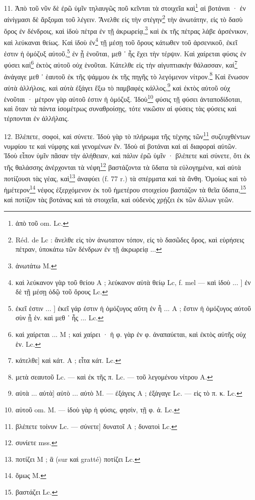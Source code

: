 \documentclass[a4paper, 11pt, oneside, polutonikogreek, french]{article}
\begin{document}
11. Ἀπὸ τοῦ νῦν δὲ ἐρῶ ὑμῖν τηλαυγῶς ποῦ κεῖνται τὰ στοιχεῖα καὶ\footnote{ἀπὸ τοῦ om. Lc.} αἱ βοτάναι · ἐν αἰνίγμασι δὲ ἄρξομαι τοῦ λέγειν. Ἄνελθε εἰς τὴν στέγην\footnote{Réd. de Lc : ἄνελθε εἰς τὸν ἀνωτατον τόπον, εἰς τὸ δασῶδες ὄρος, καὶ εὑρήσεις πέτραν, ὑποκάτω τῶν δένδρων ἐν τῇ ἀκρωρείᾳ ...} τὴν ἀνωτάτην, εἰς τὸ δασὺ ὄρος ἐν δένδροις, καὶ ἰδοὺ πέτρα ἐν τῇ ἀκρωρείᾳ,\footnote{ἀνωτάτω M.} καὶ ἐκ τῆς πέτρας λάβε ἀρσένικον, καὶ λεύκαναι θείως. Καὶ ἰδοὺ ἐν\footnote{καὶ λεύκανον γὰρ τοῦ θείου A ; λεύκανον αὐτὰ θείῳ Lc, f. mel --- καὶ ἰδοὺ ... ] ἐν δὲ τῇ μέσῃ ὁδῷ τοῦ ὄρους Lc.} τῇ μέσῃ τοῦ ὄρους κάτωθεν τοῦ ἀρσενικοῦ, ἐκεῖ ἐστιν ἡ ὁμόζυξ αὐτοῦ,\footnote{ἐκεῖ ἐστιν ... ] ἐκεῖ γάρ ἐστιν ἡ ὁμόζυγος αὕτη ἐν ἧ ... A ; ἔστιν ἡ ὁμόζυγος αὐτοῦ σὺν ᾗ ἑν. καὶ μεθ ᾽ ἧς ... Lc.} ἐν ᾗ ἑνοῦται, μεθ ᾽ ἧς ἔχει τὴν τέρψιν. Καὶ χαίρεται φύσις ἐν φύσει καὶ\footnote{καὶ χαίρεται ... M ; καὶ χαίρει · ἡ φ. γὰρ ἐν φ. ἀναπαύεται, καὶ ἐκτὸς αὐτῆς οὐχ ἑν. Lc.} ἐκτὸς αὐτοῦ οὐχ ἑνοῦται. Κάτελθε εἰς τὴν αἰγυπτιακὴν θάλασσαν, καὶ\footnote{κάτελθε] καὶ κάτ. A ; εἶτα κάτ. Lc.} ἀνάγαγε μεθ ᾽ ἑαυτοῦ ἐκ τῆς ψάμμου ἐκ τῆς πηγῆς τὸ λεγόμενον νίτρον.\footnote{μετὰ σεαυτοῦ Lc. --- καὶ ἐκ τῆς π. Lc. --- τοῦ λεγομένου νίτρου A.} Καὶ ἕνωσον αὐτὰ ἀλλήλοις, καὶ αὐτὰ ἐξάγει ἔξω τὸ παμβαφὲς κάλλος,\footnote{αὐτὰ ... αὐτὰ] αὐτὸ ... αὐτὸ M. --- ἐξάγεις A ; ἐξάγαγε Lc. --- εἰς τὸ π. κ. Lc.} καὶ ἐκτὸς αὐτοῦ οὐχ ἑνοῦται · μέτρον γὰρ αὐτοῦ ἐστιν ἡ ὁμόζυξ. Ἰδοὺ\footnote{αὐτοῦ om. M. --- ἰδοὺ γὰρ ἡ φύσις, φησὶν, τῇ φ. ἀ. Lc.} φύσις τῇ φύσει ἀνταποδίδοται, καὶ ὅταν τὰ πάντα ἰσομέτρως συναθροίσῃς, τότε νικῶσιν αἱ φύσεις τὰς φύσεις καὶ τέρπονται ἐν ἀλλήλαις.

12. Βλέπετε, σοφοὶ, καὶ σύνετε. Ἰδοὺ γὰρ τὸ πλήρωμα τῆς τέχνης τῶν\footnote{βλέπετε τοίνυν Lc. --- σύνετε] δυνατοῖ A ; δυνατοὶ Lc.} συζευχθέντων νυμφίου τε καὶ νύμφης καὶ γενομένων ἕν. Ἰδοὺ αἱ βοτάναι καὶ αἱ διαφοραὶ αὐτῶν. Ἰδοὺ εἶπον ὑμῖν πᾶσαν τὴν ἀλήθειαν, καὶ πάλιν ἐρῶ ὑμῖν · βλέπετε καὶ σύνετε, ὅτι ἐκ τῆς θαλάσσης ἀνέρχονται τὰ νέφη\footnote{συνίετε mss.} βαστάζοντα τὰ ὕδατα τὰ εὐλογημένα, καὶ αὐτὰ ποτίζουσι τὰς γέας, καὶ\footnote{ποτίζει M ; ἃ (sur καὶ gratté) ποτίζει Lc.} ἀναφύει (f. 77 r.) τὰ σπέρματα καὶ τὰ ἄνθη. Ὁμοίως καὶ τὸ ἡμέτερον\footnote{ὅμως M.} νέφος ἐξερχόμενον ἐκ τοῦ ἡμετέρου στοιχείου βαστάζον τὰ θεῖα ὕδατα,\footnote{βαστάζει Lc.} καὶ ποτίζον τὰς βοτάνας καὶ τὰ στοιχεῖα, καὶ οὐδενὸς χρῄζει ἐκ τῶν ἄλλων γεῶν.
\end{document}
